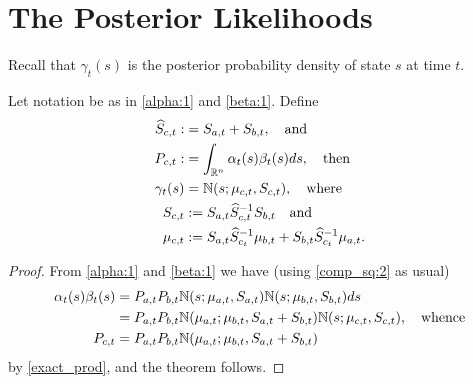 \documentclass[12pt,leqno]{article}
\begin{document}
\section{The Posterior Likelihoods}
Recall that $\gamma_t(s)$ is the posterior probability density of state $s$
at time $t$. 
\begin{Thm}
  Let notation be as in \eqref{alpha:1} and \eqref{beta:1}.  Define
\begin{align*}
  \widehat{S}_{c,t} :&= S_{a,t}+S_{b,t}, \quad\text{and}\\
  P_{c,t} :&= \int_{{\mathbb R}^n}\alpha_t(s)\beta_t(s)ds,\quad\text{then} \\
      \gamma_t(s) &= {\mathbb N}(s;\mu_{c,t},S_{c,t}),\quad\text{where}\\
      S_{c,t} &:= S_{a,t}\widehat{S}_{c,t}^{-1}S_{b,t}
      \quad\text{and}\\
      \mu_{c,t} &:= S_{a,t}\widehat{S}_{c_t}^{-1}\mu_{b,t} +
      S_{b,t}\widehat{S}_{c_t}^{-1}\mu_{a,t}.
  \end{align*}
\end{Thm}
\begin{proof}
  From \eqref{alpha:1} and \eqref{beta:1} we have (using \eqref{comp_sq:2}
  as usual)
  \begin{align*}
  \alpha_t(s)\beta_t(s) &= P_{a,t}P_{b,t}{\mathbb N}(s;\mu_{a,t},S_{a,t})
  {\mathbb N}(s;\mu_{b,t},S_{b,t})ds\\
  &= P_{a,t}P_{b,t}{\mathbb N}(\mu_{a,t};\mu_{b,t},S_{a,t}+S_{b,t}){\mathbb N}(s;\mu_{c,t},
  S_{c,t}), \quad\text{whence}\\
  P_{c,t} &= P_{a,t}P_{b,t}{\mathbb N}(\mu_{a,t};\mu_{b,t},S_{a,t}+S_{b,t})
  \end{align*}
by \eqref{exact_prod}, and the theorem follows.
\end{proof}
\end{document}
